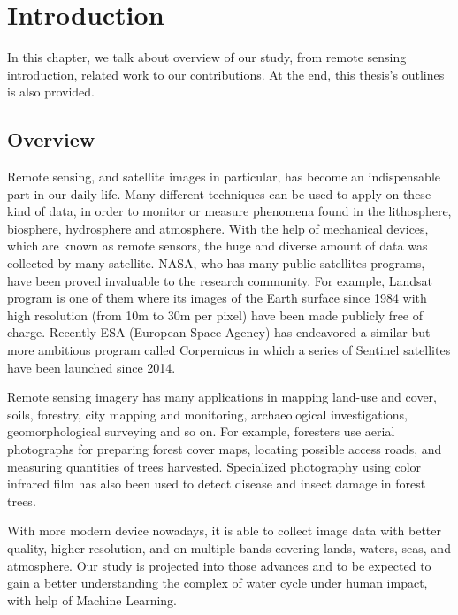 \chapter{Introduction}
\label{chap-1-intro}
\begin{ChapAbstract}
In this chapter, we talk about overview of our study, from remote sensing introduction, related work to our contributions. At the end, this thesis's outlines is also provided.

\end{ChapAbstract}


\section{Overview} 

Remote sensing, and satellite images in particular, has become an indispensable part in our daily life. Many different techniques can be used to apply on these kind of data, in order to monitor or measure phenomena found in the lithosphere, biosphere, hydrosphere and atmosphere. With the help of mechanical devices, which are known as remote sensors, the huge and diverse amount of data was collected by many satellite. NASA, who has many public satellites programs, have been proved invaluable to the research community. For example, Landsat program is one of them where its images of the Earth surface since 1984 with high resolution (from 10m to 30m per pixel) have been made publicly  free of charge. Recently ESA (European Space Agency) has endeavored a similar but more ambitious program called Corpernicus in which a series of Sentinel satellites have been launched since 2014.

Remote sensing imagery has many applications in mapping land-use and cover, soils, forestry, city mapping and monitoring, archaeological investigations, geomorphological surveying and so on. For example, foresters use aerial photographs for preparing forest cover maps, locating possible access roads, and measuring quantities of trees harvested. Specialized photography using color infrared film has also been used to detect disease and insect damage in forest trees. 

With more modern device nowadays, it is able to collect image data with better quality, higher resolution, and on multiple bands covering lands, waters, seas, and atmosphere. Our study is projected into those advances and to be expected to gain a better understanding the complex of water cycle under human impact, with help of Machine Learning.



